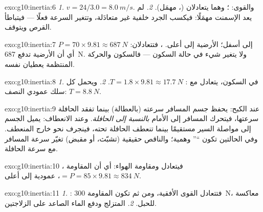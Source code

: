 \begin{solution}{exo:g10:inertia:6}
\emph{1.} $v = 24/3.0 = \qty{8.0}{m/s}$. والقوى:  ؛ وهما يتعادلان (، 
مهمَل). \emph{2.} لم يعد  الإسمنت
مهمَلًا: فيكسب الجرد  خلفية غير متعادَلة،
وتتغير السرعة فعلًا --- فيتباطأ القرص ويتوقف.
\end{solution}

\begin{solution}{exo:g10:inertia:7}
 $P = 70 \times 9.81 \approx \qty{687}{N}$ إلى أسفل؛  الأرضية
إلى أعلى. ، فتتعادلان: أي أن الأرضية تدفع
 \qty{687}{N}. ولا يتغير شيء في حالة السكون --- فالسكون والحركة المنتظمة
يعطيان  نفسه.
\end{solution}

\begin{solution}{exo:g10:inertia:8}
\emph{1.} في السكون، يتعادل  مع :
$T = 1.8 \times 9.81 \approx \qty{17.7}{N}$. \emph{2.} ويحمل كل سلك
عمودي النصف: $T = \qty{8.8}{N}$.
\end{solution}

\begin{solution}{exo:g10:inertia:9}
عند الكبح: يحفظ جسم المسافر سرعته (بالعطالة) بينما تفقد
الحافلة سرعتها، فيتحرك المسافر إلى الأمام \emph{بالنسبة إلى
الحافلة}. وعند الانعطاف: يميل الجسم إلى مواصلة السير مستقيمًا بينما تنعطف الحافلة
تحته، فينجرف نحو خارج المنعطف. وفي
الحالتين تكون ``'' وهمية؛ والناقص  حقيقية
(تشبّث، أو مقبض) تغيّر سرعة المسافر مع سرعة
الحافلة.
\end{solution}

\begin{solution}{exo:g10:inertia:10}
، فيتعادل  ومقاومة الهواء: أي أن المقاومة
$= P = 85 \times 9.81 \approx \qty{834}{N}$، عمودية إلى أعلى.
\end{solution}

\begin{solution}{exo:g10:inertia:11}
\emph{1.} : فتتعادل القوى الأفقية، ومن ثم تكون
المقاومة \qty{300}{N}، معاكسة للحبل. \emph{2.}  المتزلج
ودفع الماء الصاعد على الزلاجتين.
\end{solution}


